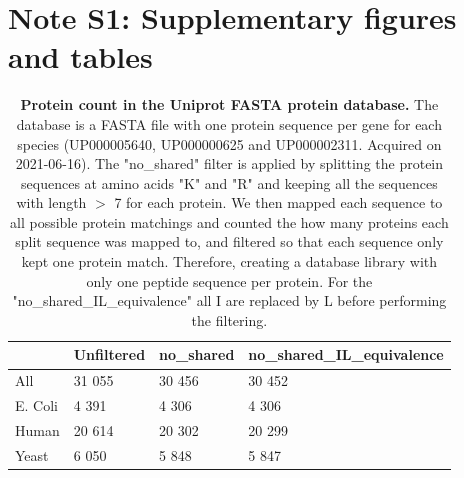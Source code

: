 \documentclass[11pt]{article}
\begin{document}
\maketitle

\section*{Note S1: Supplementary figures and tables}
\label{sec:fc-eval}


\begin{table}[hbt]
\centering
\begin{tabular}{llll}
\hline
        & Unfiltered & no\_shared & no\_shared\_IL\_equivalence \\ \hline
All     & 31 055     & 30 456     & 30 452                      \\
E. Coli & 4 391      & 4 306      & 4 306                       \\
Human   & 20 614     & 20 302     & 20 299                      \\
Yeast   & 6 050      & 5 848      & 5 847                       \\ \hline
\end{tabular}

  \caption{{\bf Protein count in the Uniprot FASTA protein database.} The database is a FASTA file with one protein sequence per gene for each species (UP000005640, UP000000625 and UP000002311. Acquired on 2021-06-16). The "no\_shared" filter is applied by splitting the protein sequences at amino acids "K" and "R" and keeping all the sequences with length $>$ 7 for each protein. We then mapped each sequence to all possible protein matchings and counted the how many proteins each split sequence was mapped to, and filtered so that each sequence only kept one protein match. Therefore, creating a database library with only one peptide sequence per protein. For the "no\_shared\_IL\_equivalence" all I are replaced by L before performing the filtering. \label{table:proteins_in_database}}

\end{table}
\end{document}
